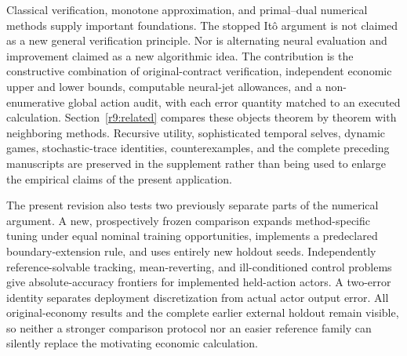 Classical verification, monotone approximation, and primal--dual numerical methods supply important foundations. The stopped It\^o argument is not claimed as a new general verification principle. Nor is alternating neural evaluation and improvement claimed as a new algorithmic idea. The contribution is the constructive combination of original-contract verification, independent economic upper and lower bounds, computable neural-jet allowances, and a non-enumerative global action audit, with each error quantity matched to an executed calculation. Section~\ref{r9:related} compares these objects theorem by theorem with neighboring methods. Recursive utility, sophisticated temporal selves, dynamic games, stochastic-trace identities, counterexamples, and the complete preceding manuscripts are preserved in the supplement rather than being used to enlarge the empirical claims of the present application.


The present revision also tests two previously separate parts of the numerical argument. A new, prospectively frozen comparison expands method-specific tuning under equal nominal training opportunities, implements a predeclared boundary-extension rule, and uses entirely new holdout seeds. Independently reference-solvable tracking, mean-reverting, and ill-conditioned control problems give absolute-accuracy frontiers for implemented held-action actors. A two-error identity separates deployment discretization from actual actor output error. All original-economy results and the complete earlier external holdout remain visible, so neither a stronger comparison protocol nor an easier reference family can silently replace the motivating economic calculation.

